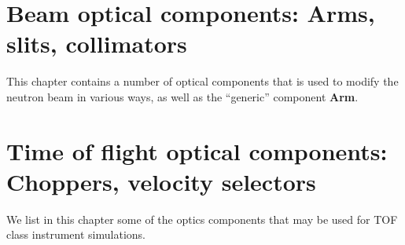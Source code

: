 
\chapter{Beam optical components:
Arms, slits, collimators}
This chapter contains a number of optical components
that is used to modify the neutron beam in various ways,
as well as the ``generic'' component {\bf Arm}.



\newpage


\newpage


\newpage


\newpage


\newpage


\newpage


\chapter{Time of flight optical components:
Choppers, velocity selectors}
We list in this chapter some of the optics components that may be used for TOF class instrument simulations.

\newpage


%

\newpage


\newpage

